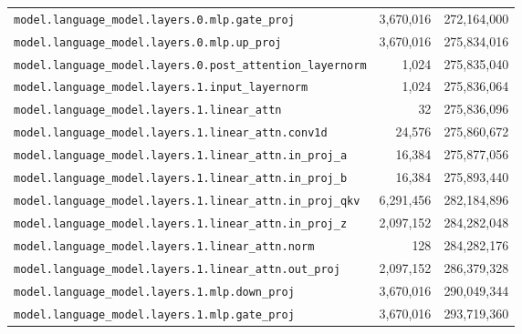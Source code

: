 \documentclass[10pt,a4paper]{article}
\theoremstyle{definition}
\begin{document}
\begin{appendices}
\begin{longtable}{p{9.5cm}rr}
\texttt{model.\allowbreak{}language\_model.\allowbreak{}layers.\allowbreak{}0.\allowbreak{}mlp.\allowbreak{}gate\_proj} & 3,670,016 & 272,164,000 \\
\texttt{model.\allowbreak{}language\_model.\allowbreak{}layers.\allowbreak{}0.\allowbreak{}mlp.\allowbreak{}up\_proj} & 3,670,016 & 275,834,016 \\
\texttt{model.\allowbreak{}language\_model.\allowbreak{}layers.\allowbreak{}0.\allowbreak{}post\_attention\_layernorm} & 1,024 & 275,835,040 \\
\texttt{model.\allowbreak{}language\_model.\allowbreak{}layers.\allowbreak{}1.\allowbreak{}input\_layernorm} & 1,024 & 275,836,064 \\
\texttt{model.\allowbreak{}language\_model.\allowbreak{}layers.\allowbreak{}1.\allowbreak{}linear\_attn} & 32 & 275,836,096 \\
\texttt{model.\allowbreak{}language\_model.\allowbreak{}layers.\allowbreak{}1.\allowbreak{}linear\_attn.\allowbreak{}conv1d} & 24,576 & 275,860,672 \\
\texttt{model.\allowbreak{}language\_model.\allowbreak{}layers.\allowbreak{}1.\allowbreak{}linear\_attn.\allowbreak{}in\_proj\_a} & 16,384 & 275,877,056 \\
\texttt{model.\allowbreak{}language\_model.\allowbreak{}layers.\allowbreak{}1.\allowbreak{}linear\_attn.\allowbreak{}in\_proj\_b} & 16,384 & 275,893,440 \\
\texttt{model.\allowbreak{}language\_model.\allowbreak{}layers.\allowbreak{}1.\allowbreak{}linear\_attn.\allowbreak{}in\_proj\_qkv} & 6,291,456 & 282,184,896 \\
\texttt{model.\allowbreak{}language\_model.\allowbreak{}layers.\allowbreak{}1.\allowbreak{}linear\_attn.\allowbreak{}in\_proj\_z} & 2,097,152 & 284,282,048 \\
\texttt{model.\allowbreak{}language\_model.\allowbreak{}layers.\allowbreak{}1.\allowbreak{}linear\_attn.\allowbreak{}norm} & 128 & 284,282,176 \\
\texttt{model.\allowbreak{}language\_model.\allowbreak{}layers.\allowbreak{}1.\allowbreak{}linear\_attn.\allowbreak{}out\_proj} & 2,097,152 & 286,379,328 \\
\texttt{model.\allowbreak{}language\_model.\allowbreak{}layers.\allowbreak{}1.\allowbreak{}mlp.\allowbreak{}down\_proj} & 3,670,016 & 290,049,344 \\
\texttt{model.\allowbreak{}language\_model.\allowbreak{}layers.\allowbreak{}1.\allowbreak{}mlp.\allowbreak{}gate\_proj} & 3,670,016 & 293,719,360 \\

\end{longtable}
\end{appendices}
\end{document}
